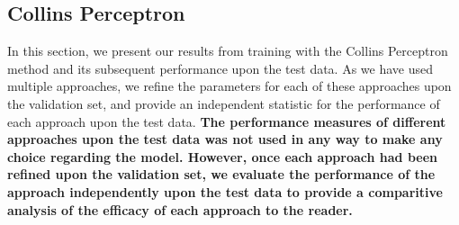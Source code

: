 \documentclass[11pt,a4paper,oneside]{article}
\begin{document}

\subsection{Collins Perceptron}

In this section, we present our results from training with the Collins Perceptron method and its subsequent performance upon the test data. As we have used multiple approaches, we refine the parameters for each of these approaches upon the validation set, and provide an independent statistic for the performance of each approach upon the test data. \textbf{The performance measures of different approaches upon the test data was not used in any way to make any choice regarding the model. However, once each approach had been refined upon the validation set, we evaluate the performance of the approach independently upon the test data to provide a comparitive analysis of the efficacy of each approach to the reader.}
\end{document}
